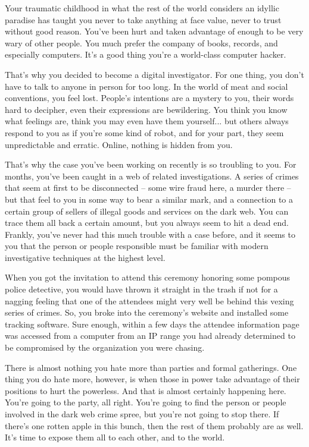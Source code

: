 \documentclass[char]{guildcamp4}
\begin{document}
\name{\cLisbet{}}


Your traumatic childhood in what the rest of the world considers an idyllic paradise has taught you never to take anything at face value, never to trust without good reason. You've been hurt and taken advantage of enough to be very wary of other people. You much prefer the company of books, records, and especially computers. It's a good thing you're a world-class computer hacker.

That's why you decided to become a digital investigator. For one thing, you don't have to talk to anyone in person for too long. In the world of meat and social conventions, you feel lost. People's intentions are a mystery to you, their words hard to decipher, even their expressions are bewildering. You think you know what feelings are, think you may even have them yourself... but others always respond to you as if you're some kind of robot, and for your part, they seem unpredictable and erratic. Online, nothing is hidden from you.

That's why the case you've been working on recently is so troubling to you. For months, you've been caught in a web of related investigations. A series of crimes that seem at first to be disconnected -- some wire fraud here, a murder there -- but that feel to you in some way to bear a similar mark, and a connection to a certain group of sellers of illegal goods and services on the dark web. You can trace them all back a certain amount, but you always seem to hit a dead end. Frankly, you've never had this much trouble with a case before, and it seems to you that the person or people responsible must be familiar with modern investigative techniques at the highest level.

When you got the invitation to attend this ceremony honoring some pompous police detective, you would have thrown it straight in the trash if not for a nagging feeling that one of the attendees might very well be behind this vexing series of crimes. So, you broke into the ceremony's website and installed some tracking software. Sure enough, within a few days the attendee information page was accessed from a computer from an IP range you had already determined to be compromised by the organization you were chasing.

There is almost nothing you hate more than parties and formal gatherings. One thing you do hate more, however, is when those in power take advantage of their positions to hurt the powerless. And that is almost certainly happening here. You're going to the party, all right. You're going to find the person or people involved in the dark web crime spree, but you're not going to stop there. If there's one rotten apple in this bunch, then the rest of them probably are as well. It's time to expose them all to each other, and to the world.
\end{document}
